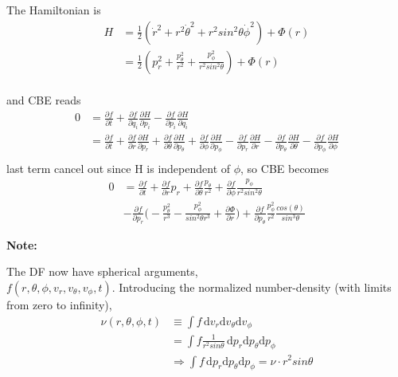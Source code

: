 The Hamiltonian is
\begin{equation}
\begin{aligned}
H&=\frac{1}{2}(\dot{r}^2 + r^2\dot{\theta}^2 + r^2sin^2\theta\dot{\phi}^2) + \Phi(r) \\
 &=\frac{1}{2}(p_r^2 + \frac{p_{\theta}^2}{r^2} + \frac{p_{\phi}^2}{r^2sin^2\theta} ) + \Phi(r) 
\end{aligned}
\end{equation} \\
and CBE reads \\
\begin{equation}
\begin{aligned}
0&=\frac{\partial f}{\partial t} + \frac{\partial f}{\partial q_i}\frac{\partial H}{\partial p_i} - 
\frac{\partial f}{\partial p_i}\frac{\partial H}{\partial q_i} \\
 &=\frac{\partial f}{\partial t} + \frac{\partial f}{\partial r}\frac{\partial H}{\partial p_r} +
\frac{\partial f}{\partial \theta}\frac{\partial H}{\partial p_{\theta}} + 
\frac{\partial f}{\partial \phi}\frac{\partial H}{\partial p_{\phi}} -
\frac{\partial f}{\partial p_r}\frac{\partial H}{\partial r} -
\frac{\partial f}{\partial p_{\theta}}\frac{\partial H}{\partial \theta} -
\frac{\partial f}{\partial p_{\phi}}\frac{\partial H}{\partial \phi} \\
\end{aligned}
\end{equation} 
last term cancel out since H is independent of $\phi$, so CBE becomes
\begin{equation}
\begin{aligned}
0&=\frac{\partial f}{\partial t} + \frac{\partial f}{\partial r}p_r +
\frac{\partial f}{\partial \theta}\frac{p_{\theta}}{r^2} + 
\frac{\partial f}{\partial \phi}\frac{p_{\phi}}{r^2sin^2\theta} \\
&-\frac{\partial f}{\partial p_r}\big(     
-\frac{p_{\theta}^2}{r^3} - \frac{p_{\phi}^2}{sin^2\theta r^3} + \frac{\partial \Phi}{\partial r} \big)  +  \frac{\partial f}{\partial p_{\theta}}\frac{p_{\phi}^2}{r^2}\frac{cos(\theta)}{sin^3 \theta}
\end{aligned}
\end{equation} 
\centerline{\textbf{Note:}} 
The DF now have spherical arguments, \\ $ f(r, \theta, \phi, v_r, v_{\theta}, v_{\phi} , t)$. Introducing the normalized number-density (with limits from zero to infinity),
\begin{equation}
\begin{aligned}
\nu(r, \theta, \phi, t) & \equiv \int \! f \, \mathrm{d}v_r \mathrm{d}v_{\theta} \mathrm{d}v_{\phi} \\
& = \int \! f \frac{1}{r^2sin\theta} \, \mathrm{d}p_r \mathrm{d}p_{\theta} \mathrm{d}p_{\phi} \\
& \Rightarrow \int \! f  \, \mathrm{d}p_r \mathrm{d}p_{\theta} \mathrm{d}p_{\phi} = \nu\cdot r^2 sin\theta
\end{aligned}
\end{equation}
